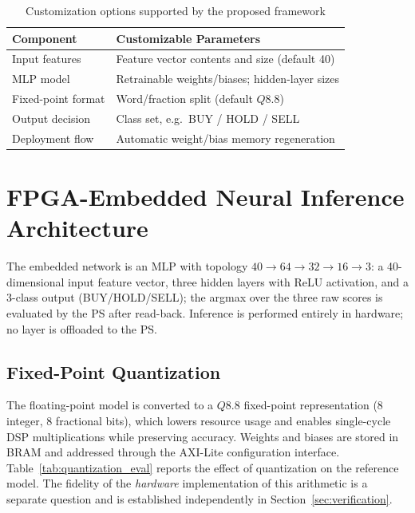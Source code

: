 \documentclass[final,5p,times,twocolumn]{elsarticle}
\begin{document}
\begin{table}[htbp]
\centering
\caption{Customization options supported by the proposed framework}
\label{tab:customization_options}
\begin{tabular}{p{3.0cm} p{4.4cm}}
\toprule
Component & Customizable Parameters \\
\midrule
Input features & Feature vector contents and size (default 40) \\
MLP model & Retrainable weights/biases; hidden-layer sizes \\
Fixed-point format & Word/fraction split (default $Q8.8$) \\
Output decision & Class set, e.g.\ BUY / HOLD / SELL \\
Deployment flow & Automatic weight/bias memory regeneration \\
\bottomrule
\end{tabular}
\end{table}

\section{FPGA-Embedded Neural Inference Architecture}
The embedded network is an MLP with topology
$40\!\rightarrow\!64\!\rightarrow\!32\!\rightarrow\!16\!\rightarrow\!3$: a
40-dimensional input feature vector, three hidden layers with ReLU activation,
and a 3-class output (BUY/HOLD/SELL); the argmax over the three raw scores is
evaluated by the PS after read-back.
Inference is performed entirely in hardware; no layer is offloaded to the PS.

\subsection{Fixed-Point Quantization}
The floating-point model is converted to a $Q8.8$ fixed-point representation
(8 integer, 8 fractional bits), which lowers resource usage and enables
single-cycle DSP multiplications while preserving accuracy. Weights and biases
are stored in BRAM and addressed through the AXI-Lite configuration interface.
Table~\ref{tab:quantization_eval} reports the effect of quantization on the
reference model. The fidelity of the \emph{hardware} implementation of this
arithmetic is a separate question and is established independently in
Section~\ref{sec:verification}.
\end{document}

